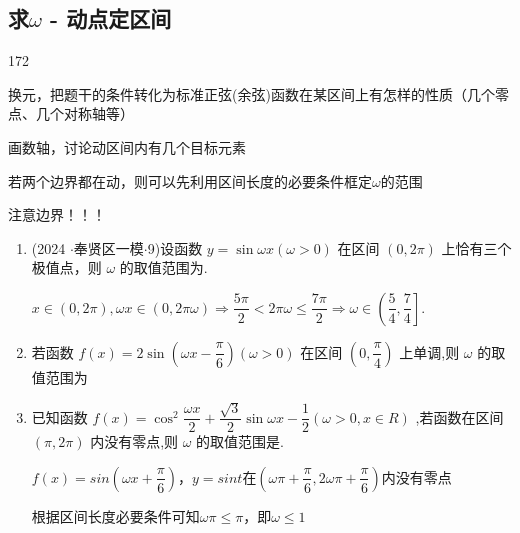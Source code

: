\subsection*{求$\omega$ - 动点定区间}
\begin{dingautolist}{172}
    \item 换元，把题干的条件转化为标准正弦(余弦)函数在某区间上有怎样的性质（几个零点、几个对称轴等）
    \item 画数轴，讨论动区间内有几个目标元素
    \item 若两个边界都在动，则可以先利用区间长度的必要条件框定$\omega$的范围
    \item 注意边界！！！
\end{dingautolist}
\begin{enumerate}
    \item (2024 $\cdot$奉贤区一模$\cdot$9)设函数 $y = \sin {\omega x}\left( {\omega  > 0}\right)$ 在区间 $\left( {0,{2\pi }}\right)$ 上恰有三个极值点，则 $\omega$ 的取值范围为.
    \begin{jieda}
        $x \in  \left( {0,{2\pi }}\right) ,{\omega x}  \in  \left( {0,{2\pi \omega }}\right)  \Longrightarrow  \dfrac{5\pi }{2} < {2\pi \omega } \leq  \dfrac{7\pi }{2} \Longrightarrow  \omega  \in  \left( {\dfrac{5}{4},\dfrac{7}{4}}\right\rbrack$.
    \end{jieda}
    \item 若函数 $f\left( x\right)  = 2\sin \left( {{\omega x} - \dfrac{\pi }{6}}\right) \left( {\omega  > 0}\right)$ 在区间 $\left( {0,\dfrac{\pi }{4}}\right)$ 上单调,则 $\omega$ 的取值范围为\blkda{$\left(0, \dfrac{8}{3}\right]$}
    \item 已知函数 $f\left( x\right)  = {\cos }^{2}\dfrac{\omega x}{2} + \dfrac{\sqrt{3}}{2}\sin {\omega x} - \dfrac{1}{2}\left( {\omega  > 0,x \in  R}\right)$ ,若函数在区间 $\left( {\pi ,{2\pi }}\right)$ 内没有零点,则 $\omega$ 的取值范围是\blkda[3]{$\left(0, \dfrac{5}{12}\right] \cup \left[\dfrac{5}{6}, \dfrac{11}{12}\right]$}.
    \begin{jieda}
        $f(x) = sin\left(\omega x+\dfrac{\pi}{6}\right)$，$y = sint$在$\left(\omega\pi+\dfrac{\pi}{6}, 2\omega \pi + \dfrac{\pi}{6}\right)$内没有零点

        根据区间长度必要条件可知$\omega \pi \leq \pi$，即$\omega \leq 1$

    \end{jieda}
\end{enumerate}
